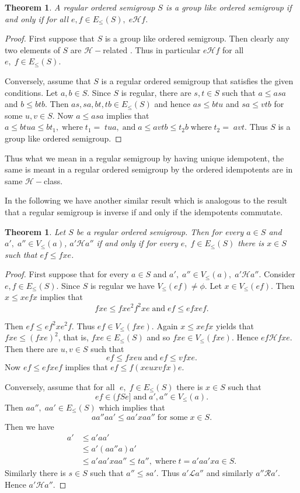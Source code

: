 \documentclass[13pt]{article}
\newtheorem{Theorem}[theorem]{Theorem}
\theoremstyle{definition}
\theoremstyle{remark}
\numberwithin{equation}{section}
\newcommand{\lc}{\mathcal{L}}
\newcommand{\rc}{\mathcal{R}}
\newcommand{\hc}{\mathcal{H}}
\begin{document}
\begin{Theorem}\label{cr5}
A  regular ordered semigroup $S$ is a  group like ordered semigroup
if and only if for all $e,f \in E_{\leq} (S), \;e \hc f$.
\end{Theorem}
\begin{proof}
First suppose that $S$ is  a  group like ordered semigroup. Then
clearly any two elements of $S$ are $\hc-$related . Thus in
particular $e \hc f$ for all $e, \;f \in E_{\leq}(S)$.

Conversely, assume  that $S$ is a regular ordered  semigroup that
satisfies the given conditions. Let $a, b \in S$. Since $S$ is
regular, there are $s, t \in S$ such that $a \leq asa$ and $b \leq
btb$. Then  $as, sa, bt, tb \in E_{\leq}(S)$ and hence $as \leq btu$
and $sa \leq vtb$ for some $u, v \in S$. Now  $a \leq asa$ implies
that $a \leq btua \leq bt_1, \; \textrm{where} \;t_1= \;tua,
\;\textrm{and} \;a \leq avtb \leq t_2 b  \; \textrm{where} \;t_2=
\;avt$. Thus $S$ is a group like ordered semigroup.
\end{proof}

Thus what we mean in a regular semigroup by having unique
idempotent, the same is meant in a regular ordered  semigroup by the
ordered idempotents are in  same $\hc-$class.

In the following we have another similar result which is analogous
to the result that a regular semigroup is inverse if and only if the
idempotents commutate.
\begin{Theorem}\label{cr6}
Let $S$ be a regular ordered  semigroup. Then for every $a \in S$
and $a', \;a'' \in V_{\leq}(a)$, $a' \hc a''$ if and only if for
every $e, \;f \in E_{\leq}(S)$ there is $x \in S$ such that $ef \leq
fxe$.
\end{Theorem}
\begin{proof}
First suppose that for every $a \in S$ and  $a', \;a'' \in
V_{\leq}(a), \;a' \hc a''$. Consider $e, f \in E_{\leq}(S)$. Since
$S$ is regular we have  $ V_{\leq}(ef)\neq \phi$. Let  $x \in
V_{\leq}(ef)$. Then $x  \leq  x ef x$ implies that $$fxe \leq fxe^2
f^2xe \;\textrm{and} \;ef \leq ef x ef. $$

Then  $ef \leq ef^2 x e^2f$. Thus $ef \in V_{\leq}(fxe)$. Again  $x
\leq x ef x$ yields that $fxe \leq (fxe)^2$, that is,   $fxe \in
E_{\leq}(S)$ and so $fxe \in V_{\leq}(fxe)$. Hence $ef \hc fxe$.
Then there are $u, v \in S$ such that $$ef \leq fxeu \;\textrm{and}
\;ef \leq vfxe.$$ Now $ef \leq ef x ef$ implies that $ef \leq f(xe
uxv fx)e$.

Conversely, assume  that for all $\;e,\;f \in E_{\leq}(S)$ there is
$x \in S$ such that $$ef \in (fSe]  \;\textrm{and} \;a', a'' \in
V_{\leq}(a).$$ Then $aa'', \;aa' \in E_{\leq}(S)$ which implies that
$$aa''aa' \leq aa' x aa'' \;\textrm{for some} \;x \in S.$$  Then we have
\begin{align*}
a' &\leq a'aa'\\
   & \leq a'(aa''a) a'\\
   & \leq a'a  a'x aa''\leq t a'',
\;\textrm{where} \;t = a'a a'x a \in S.
\end{align*}
 Similarly there is $s \in S$
such that $a'' \leq sa'$. Thus $a' \lc a''$ and similarly $a'' \rc
a'$. Hence $a' \hc a''$.
\end{proof}
\end{document}
